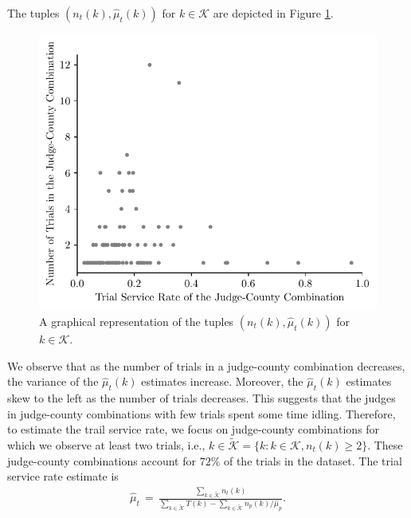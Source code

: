 \documentclass[11pt, oneside]{article}   	%
\theoremstyle{ModifiedStyle}
\begin{document}
			The tuples $(n_t(k),{\hat{\mu}_t(k)})$ for $k\in\mathcal{K}$ are depicted in Figure \ref{Figure_Trial_Sercice_Rate_Vs_Trial_Per_County}.
			\begin{figure}[H]
				\centering
				\includegraphics[scale=0.75]{Figures/Judge_Capacity_Vs_Number_of_Trials}
				\vspace{-2mm}
				\caption{A graphical representation of the tuples $(n_t(k),{\hat{\mu}_t(k)})$ for $k\in\mathcal{K}$.}
				\label{Figure_Trial_Sercice_Rate_Vs_Trial_Per_County}
			\end{figure}
			We observe that as the number of trials in a judge-county combination decreases, the variance of the $\hat{\mu}_t(k)$ estimates increase. Moreover, the $\hat{\mu}_t(k)$ estimates skew to the left as the number of trials decreases. This suggests that the judges in judge-county combinations with few trials spent some time idling. Therefore, to estimate the trail service rate, we focus on judge-county combinations for which we observe at least two trials, i.e., $k \in \tilde{\mathcal{K}} = \{k:k\in\mathcal{K},n_t(k)\geq 2\}$. These judge-county combinations account for $72\%$ of the trials in the dataset. The trial service rate estimate is
			\begin{align*}
				\hat{\mu}_t \,=\, \frac{ \sum\limits_{k\in\tilde{\mathcal{K}}} n_t(k) }{\sum\limits_{k\in\tilde{\mathcal{K}}} T(k) - \sum\limits_{k\in\tilde{\mathcal{K}}} n_p(k) / \hat{\mu}_p }.
			\end{align*}
\end{document}
